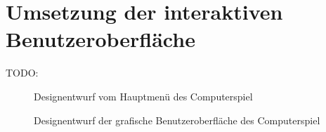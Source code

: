 \chapter{Umsetzung der interaktiven Benutzeroberfläche}
\label{chapter:umsetzung-der-interaktiven-benutzeroberfläche}

TODO:


\begin{figure}[!ht]
    \centering
    \caption{Designentwurf vom Hauptmenü des Computerspiel}
    \label{fig:design-main-ui}
\end{figure}

\begin{figure}[!ht]
    \centering
    \caption{Designentwurf der grafische Benutzeroberfläche des Computerspiel}
    \label{fig:design-game-ui}
\end{figure}